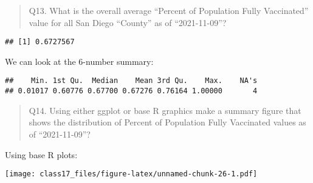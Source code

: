 \documentclass[
]{article}
\newenvironment{Shaded}{\begin{snugshade}}{\end{snugshade}}
\newcommand{\AttributeTok}[1]{\textcolor[rgb]{0.77,0.63,0.00}{#1}}
\newcommand{\ConstantTok}[1]{\textcolor[rgb]{0.00,0.00,0.00}{#1}}
\newcommand{\FunctionTok}[1]{\textcolor[rgb]{0.00,0.00,0.00}{#1}}
\newcommand{\NormalTok}[1]{#1}
\newcommand{\OtherTok}[1]{\textcolor[rgb]{0.56,0.35,0.01}{#1}}
\newcommand{\SpecialCharTok}[1]{\textcolor[rgb]{0.00,0.00,0.00}{#1}}
\newcommand{\StringTok}[1]{\textcolor[rgb]{0.31,0.60,0.02}{#1}}
\begin{document}
\begin{quote}
Q13. What is the overall average ``Percent of Population Fully
Vaccinated'' value for all San Diego ``County'' as of ``2021-11-09''?
\end{quote}

\begin{Shaded}
\end{Shaded}

\begin{verbatim}
## [1] 0.6727567
\end{verbatim}

We can look at the 6-number summary:

\begin{Shaded}
\end{Shaded}

\begin{verbatim}
##    Min. 1st Qu.  Median    Mean 3rd Qu.    Max.    NA's 
## 0.01017 0.60776 0.67700 0.67276 0.76164 1.00000       4
\end{verbatim}

\begin{quote}
Q14. Using either ggplot or base R graphics make a summary figure that
shows the distribution of Percent of Population Fully Vaccinated values
as of ``2021-11-09''?
\end{quote}

Using base R plots:

\begin{Shaded}
\end{Shaded}

\texttt{[image: class17\_files/figure-latex/unnamed-chunk-26-1.pdf]}
\end{document}
